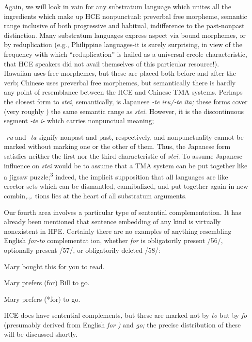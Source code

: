 Again, we will look in vain for any substratum language which unites all the ingredients which make up HCE nonpunctual: preverbal free morpheme, semantic range inclusive of both progressive and habi\-tual, indifference to the past-nonpast distinction. Many substratum languages express aspect via bound morphemes, or by reduplication (e.g., Philippine languages-it is surely surprising, in view of the fre\-quency with which ``reduplication'' is hailed as a universal creole characteristic, that HCE speakers did not avail themselves of this particular resource!). Hawaiian uses free morphemes, but these are placed both before and after the verb; Chinese uses preverbal free morphemes, but semantically there is hardly any point of resemblance between the HCE and Chinese TMA systems. Perhaps the closest form to \textit{stei,} semantically, is Japanese \textit{{}-te} \textit{iru/-te} \textit{ita;} these forms cover (very roughly ) the same semantic range as \textit{stei.} However, it is the discontinuous segment \textit{{}-te }\textit{i- }which carries nonpunctual meaning;

\textit{{}-ru} and \textit{{}-ta} signify nonpast and past, respectively, and nonpunctuality cannot be marked without marking one or the other of them. Thus, the Japanese form satisfies neither the first nor the third characteristic of \textit{stei.} To assume Japanese influence on \textit{stei} would be to assume that a TMA system can be put together like a jigsaw puzzle;\textsuperscript{3} indeed, the implicit supposition that all languages are like erector sets which can be dismantled, cannibalized, and put together again in new combin,.,. tions lies at the heart of all substratum arguments.

Our fourth area involves a particular type of sentential comple\-mentation. It has already been mentioned that sentence embedding of any kind is virtually nonexistent in HPE. Certainly there are no examples of anything resembling English \textit{for-to }complementat ion,
whether \textit{for} is obligatorily present /56/, optionally present /57/, or obligatorily deleted /58/:

\ea\label{ex:56}
 Mary bought this for you to read.
\glt
\z

\ea\label{ex:57}
 Mary prefers (for) Bill to go.
\glt
\z

\ea\label{ex:58}
 Mary prefers (*for) to go.
\glt
\z

HCE does have sentential complements, but these are marked not by \textit{to} but by \textit{fo} (presumably derived from English \textit{for} \textit{)} and \textit{go;} the precise distribution of these will be discussed shortly.

